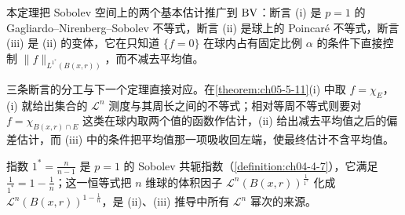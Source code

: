 ﻿\documentclass[../../main.tex]{subfiles}%
\begin{document}
\begin{remark}\label{remark:ch05-thm-5-10-动机}
本定理把 Sobolev 空间上的两个基本估计推广到 $\mathrm{BV}$：断言 (i) 是 $p=1$ 的 Gagliardo--Nirenberg--Sobolev 不等式，断言 (ii) 是球上的 Poincaré 不等式，断言 (iii) 是 (ii) 的变体，它在只知道 $\{f=0\}$ 在球内占有固定比例 $\alpha$ 的条件下直接控制 $\lVert f\rVert_{L^{1^*}(B(x,r))}$，而不减去平均值。

三条断言的分工与下一个定理直接对应。在\cref{theorem:ch05-5-11}(i) 中取 $f=\chi_E$，(i) 就给出集合的 $\mathcal{L}^n$ 测度与其周长之间的不等式；相对等周不等式则要对 $f=\chi_{B(x,r)\cap E}$ 这类在球内取两个值的函数作估计，(ii) 给出减去平均值之后的偏差估计，而 (iii) 中的条件把平均值那一项吸收回左端，使最终估计不含平均值。%

指数 $1^*=\frac{n}{n-1}$ 是 $p=1$ 的 Sobolev 共轭指数（\cref{definition:ch04-4-7}），它满足 $\frac{1}{1^*}=1-\frac1n$；这一恒等式把 $n$ 维球的体积因子 $\mathcal{L}^n(B(x,r))^{\frac{1}{1^*}}$ 化成 $\mathcal{L}^n(B(x,r))^{1-\frac1n}$，是 (ii)、(iii) 推导中所有 $\mathcal{L}^n$ 幂次的来源。%
\end{remark}
\end{document}
